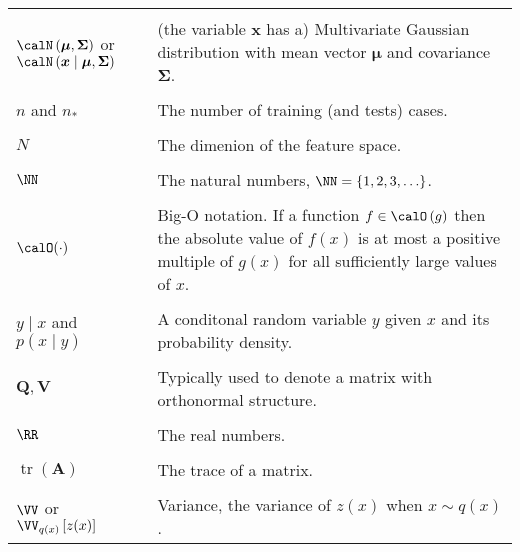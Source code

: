 \begin{longtable}{lp{}}
    \\\\
    $\calN \left( \bm{\mu} , \bm{\Sigma} \right)$ or $\calN \left( \bm{x} \mid \bm{\mu} , \bm{\Sigma} \right)$ & (the variable $\bm{x}$ has a) Multivariate Gaussian distribution with mean vector $\bm{\mu}$ and covariance $\bm{\Sigma}$.
    \\\\
    $n$ and $n_{\ast}$                                                                                         & The number of training (and tests) cases.
    \\\\
    $N$                                                                                                        & The dimenion of the feature space.
    \\\\
    $\NN$                                                                                                      & The natural numbers, $\NN = \left\{ 1,2,3,\ldots \right\}$.
    \\\\
    $\calO (\cdot)$                                                                                            & Big-O notation. If a function $f \in \calO \left( g \right)$ then the absolute value of $f(x)$ is at most a positive multiple of $g(x)$ for all sufficiently large values of $x$.
    \\\\
    $y \mid x$ and $p \left( x \mid y \right)$                                                                 & A conditonal random variable $y$ given $x$ and its probability density.
    \\\\
    $\bm{Q}, \bm{V}$                                                                                           & Typically used to denote a matrix with orthonormal structure.
    \\\\
    $\RR$                                                                                                      & The real numbers.
    \\\\
    $\operatorname{tr} \left( \bm{A} \right)$                                                                  & The trace of a matrix.
    \\\\
    $\VV$ or $\VV_{q(x)} \left[ z(x) \right]$                                                                  & Variance, the variance of $z(x)$ when $x \sim q(x)$.

\end{longtable}
